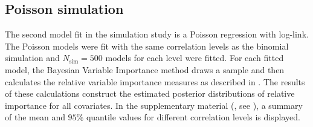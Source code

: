 \subsection{Poisson simulation}
The second model fit in the simulation study is a Poisson regression with log-link. The Poisson models were fit with the same correlation levels as the binomial simulation and $N_{\text{sim}}=500$ models for each level were fitted. For each fitted model, the Bayesian Variable Importance method draws a sample and then calculates the relative variable importance measures as described in . The results of these calculations construct the estimated posterior distributions of relative importance for all covariates. In the supplementary material (, see ), a summary of the mean and $95\%$ quantile values for different correlation levels is displayed.
